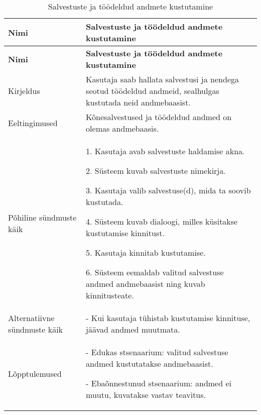 \begin{longtable}{|p{2.5cm}|p{11cm}|}
    \caption{{Salvestuste ja töödeldud andmete kustutamine}}
    \label{tab:kasutusjuht2}\\ \hline
    \textbf{Nimi} &  \textbf{Salvestuste ja töödeldud andmete kustutamine}  \\
    \hline
    \endfirsthead
    \hline
    \textbf{Nimi} &  \textbf{Salvestuste ja töödeldud andmete kustutamine}  \\
    \hline
    \endhead
    \endfoot
    \hline
    \endlastfoot
    Kirjeldus & Kasutaja saab hallata salvestusi ja nendega seotud töödeldud andmeid, sealhulgas kustutada neid andmebaasist.\\ \hline
    Eeltingimused & Kõnesalvestused ja töödeldud andmed on olemas andmebaasis.\\ \hline
    Põhiline sündmuste käik & 
    1. Kasutaja avab salvestuste haldamise akna.
    
    2. Süsteem kuvab salvestuste nimekirja.
    
    3. Kasutaja valib salvestuse(d), mida ta soovib kustutada.
    
    4. Süsteem kuvab dialoogi, milles küsitakse kustutamise kinnitust.
    
    5. Kasutaja kinnitab kustutamise.
    
    6. Süsteem eemaldab valitud salvestuse andmed andmebaasist ning kuvab kinnitusteate.
    \\ \hline
    Alternatiivne sündmuste käik & 
    - Kui kasutaja tühistab kustutamise kinnituse, jäävad andmed muutmata.
    \\ \hline
    Lõpptulemused & 
    - Edukas stsenaarium: valitud salvestuse andmed kustutatakse andmebaasist.
    
    - Ebaõnnestunud stsenaarium: andmed ei muutu, kuvatakse vastav teavitus.
    \\ \hline
\end{longtable}


